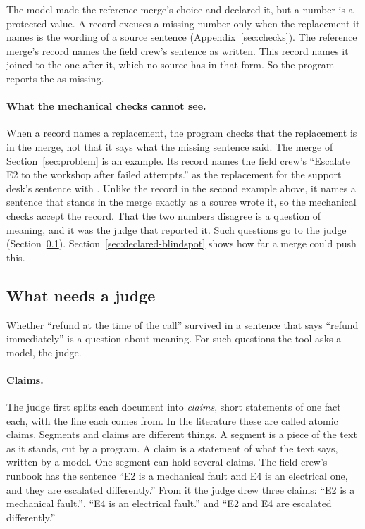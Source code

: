 \noindent The model made the reference merge's choice and declared it, but a number is a protected value. A record excuses a missing number only when the replacement it names is the wording of a source sentence (Appendix~\ref{sec:checks}). The reference merge's record names the field crew's sentence as written. This record names it joined to the one after it, which no source has in that form. So the program reports the  as missing.

\paragraph{What the mechanical checks cannot see.} When a record names a replacement, the program checks that the replacement is in the merge, not that it says what the missing sentence said. The merge of Section~\ref{sec:problem} is an example. Its record names the field crew's ``Escalate E2 to the workshop after  failed attempts.'' as the replacement for the support desk's sentence with . Unlike the record in the second example above, it names a sentence that stands in the merge exactly as a source wrote it, so the mechanical checks accept the record. That the two numbers disagree is a question of meaning, and it was the judge that reported it. Such questions go to the judge (Section~\ref{sec:judged}). Section~\ref{sec:declared-blindspot} shows how far a merge could push this.

\subsection{What needs a judge}
\label{sec:judged}

Whether ``refund at the time of the call'' survived in a sentence that says ``refund immediately'' is a question about meaning. For such questions the tool asks a model, the judge.

\paragraph{Claims.} The judge first splits each document into \emph{claims}, short statements of one fact each, with the line each comes from. In the literature these are called atomic claims. Segments and claims are different things. A segment is a piece of the text as it stands, cut by a program. A claim is a statement of what the text says, written by a model. One segment can hold several claims. The field crew's runbook has the sentence ``E2 is a mechanical fault and E4 is an electrical one, and they are escalated differently.'' From it the judge drew three claims: ``E2 is a mechanical fault.'', ``E4 is an electrical fault.'' and ``E2 and E4 are escalated differently.''

